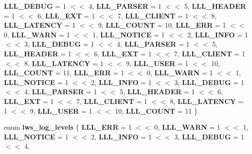 \begin{DoxyCompactItemize}
{\bfseries L\+L\+L\+\_\+\+D\+E\+B\+UG} = 1 $<$$<$ 4, 
{\bfseries L\+L\+L\+\_\+\+P\+A\+R\+S\+ER} = 1 $<$$<$ 5, 
\newline
{\bfseries L\+L\+L\+\_\+\+H\+E\+A\+D\+ER} = 1 $<$$<$ 6, 
{\bfseries L\+L\+L\+\_\+\+E\+XT} = 1 $<$$<$ 7, 
{\bfseries L\+L\+L\+\_\+\+C\+L\+I\+E\+NT} = 1 $<$$<$ 8, 
{\bfseries L\+L\+L\+\_\+\+L\+A\+T\+E\+N\+CY} = 1 $<$$<$ 9, 
\newline
{\bfseries L\+L\+L\+\_\+\+C\+O\+U\+NT} = 10, 
{\bfseries L\+L\+L\+\_\+\+E\+RR} = 1 $<$$<$ 0, 
{\bfseries L\+L\+L\+\_\+\+W\+A\+RN} = 1 $<$$<$ 1, 
{\bfseries L\+L\+L\+\_\+\+N\+O\+T\+I\+CE} = 1 $<$$<$ 2, 
\newline
{\bfseries L\+L\+L\+\_\+\+I\+N\+FO} = 1 $<$$<$ 3, 
{\bfseries L\+L\+L\+\_\+\+D\+E\+B\+UG} = 1 $<$$<$ 4, 
{\bfseries L\+L\+L\+\_\+\+P\+A\+R\+S\+ER} = 1 $<$$<$ 5, 
{\bfseries L\+L\+L\+\_\+\+H\+E\+A\+D\+ER} = 1 $<$$<$ 6, 
\newline
{\bfseries L\+L\+L\+\_\+\+E\+XT} = 1 $<$$<$ 7, 
{\bfseries L\+L\+L\+\_\+\+C\+L\+I\+E\+NT} = 1 $<$$<$ 8, 
{\bfseries L\+L\+L\+\_\+\+L\+A\+T\+E\+N\+CY} = 1 $<$$<$ 9, 
{\bfseries L\+L\+L\+\_\+\+U\+S\+ER} = 1 $<$$<$ 10, 
\newline
{\bfseries L\+L\+L\+\_\+\+C\+O\+U\+NT} = 11, 
{\bfseries L\+L\+L\+\_\+\+E\+RR} = 1 $<$$<$ 0, 
{\bfseries L\+L\+L\+\_\+\+W\+A\+RN} = 1 $<$$<$ 1, 
{\bfseries L\+L\+L\+\_\+\+N\+O\+T\+I\+CE} = 1 $<$$<$ 2, 
\newline
{\bfseries L\+L\+L\+\_\+\+I\+N\+FO} = 1 $<$$<$ 3, 
{\bfseries L\+L\+L\+\_\+\+D\+E\+B\+UG} = 1 $<$$<$ 4, 
{\bfseries L\+L\+L\+\_\+\+P\+A\+R\+S\+ER} = 1 $<$$<$ 5, 
{\bfseries L\+L\+L\+\_\+\+H\+E\+A\+D\+ER} = 1 $<$$<$ 6, 
\newline
{\bfseries L\+L\+L\+\_\+\+E\+XT} = 1 $<$$<$ 7, 
{\bfseries L\+L\+L\+\_\+\+C\+L\+I\+E\+NT} = 1 $<$$<$ 8, 
{\bfseries L\+L\+L\+\_\+\+L\+A\+T\+E\+N\+CY} = 1 $<$$<$ 9, 
{\bfseries L\+L\+L\+\_\+\+U\+S\+ER} = 1 $<$$<$ 10, 
\newline
{\bfseries L\+L\+L\+\_\+\+C\+O\+U\+NT} = 11
 \}
\item 
\mbox{\label{group__log_ga14542b84d2c76efa7814124bb10f9c5f}} 
enum {\bfseries lws\+\_\+log\+\_\+levels} \{ \newline
{\bfseries L\+L\+L\+\_\+\+E\+RR} = 1 $<$$<$ 0, 
{\bfseries L\+L\+L\+\_\+\+W\+A\+RN} = 1 $<$$<$ 1, 
{\bfseries L\+L\+L\+\_\+\+N\+O\+T\+I\+CE} = 1 $<$$<$ 2, 
{\bfseries L\+L\+L\+\_\+\+I\+N\+FO} = 1 $<$$<$ 3, 
\newline
{\bfseries L\+L\+L\+\_\+\+D\+E\+B\+UG} = 1 $<$$<$ 4, 
$$
\end{DoxyCompactItemize}
